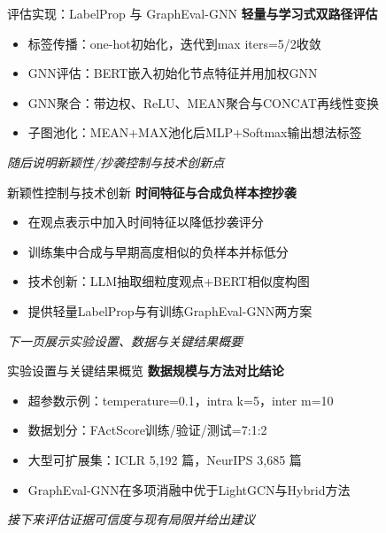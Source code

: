\documentclass{beamer}
\begin{document}
\begin{frame}{评估实现：LabelProp 与 GraphEval-GNN}
    \textbf{轻量与学习式双路径评估}
    \begin{itemize}
        \item 标签传播：one-hot初始化，迭代到max iters=5/2收敛
        \item GNN评估：BERT嵌入初始化节点特征并用加权GNN
        \item GNN聚合：带边权、ReLU、MEAN聚合与CONCAT再线性变换
        \item 子图池化：MEAN+MAX池化后MLP+Softmax输出想法标签
    \end{itemize}
    \vspace{1em}
    \textit{随后说明新颖性/抄袭控制与技术创新点}
\end{frame}

\begin{frame}{新颖性控制与技术创新}
    \textbf{时间特征与合成负样本控抄袭}
    \begin{itemize}
        \item 在观点表示中加入时间特征以降低抄袭评分
        \item 训练集中合成与早期高度相似的负样本并标低分
        \item 技术创新：LLM抽取细粒度观点+BERT相似度构图
        \item 提供轻量LabelProp与有训练GraphEval-GNN两方案
    \end{itemize}
    \vspace{1em}
    \textit{下一页展示实验设置、数据与关键结果概要}
\end{frame}

\begin{frame}{实验设置与关键结果概览}
    \textbf{数据规模与方法对比结论}
    \begin{itemize}
        \item 超参数示例：temperature=0.1，intra k=5，inter m=10
        \item 数据划分：FActScore训练/验证/测试=7:1:2
        \item 大型可扩展集：ICLR 5,192 篇，NeurIPS 3,685 篇
        \item GraphEval-GNN在多项消融中优于LightGCN与Hybrid方法
    \end{itemize}
    \vspace{1em}
    \textit{接下来评估证据可信度与现有局限并给出建议}
\end{frame}
\end{document}
